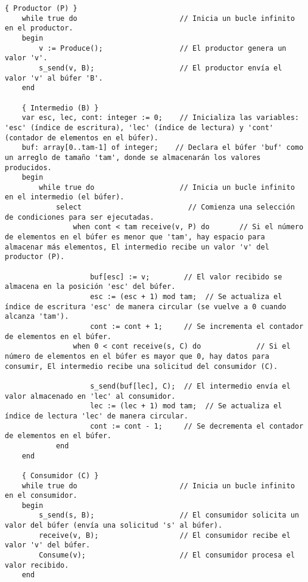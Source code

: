 \documentclass[a4paper,12pt]{article}
\begin{document}
\begin{lstlisting}[style=customcpp, caption={Productor-Consumidor con Búfer FIFO}, label={lst:prod-cons}]
    { Productor (P) }
    while true do                        // Inicia un bucle infinito en el productor.
    begin
        v := Produce();                  // El productor genera un valor 'v'.
        s_send(v, B);                    // El productor envía el valor 'v' al búfer 'B'.
    end
    
    { Intermedio (B) }
    var esc, lec, cont: integer := 0;    // Inicializa las variables: 'esc' (índice de escritura), 'lec' (índice de lectura) y 'cont' (contador de elementos en el búfer).
    buf: array[0..tam-1] of integer;    // Declara el búfer 'buf' como un arreglo de tamaño 'tam', donde se almacenarán los valores producidos.
    begin
        while true do                    // Inicia un bucle infinito en el intermedio (el búfer).
            select                         // Comienza una selección de condiciones para ser ejecutadas.
                when cont < tam receive(v, P) do       // Si el número de elementos en el búfer es menor que 'tam', hay espacio para almacenar más elementos, El intermedio recibe un valor 'v' del productor (P).

                    buf[esc] := v;        // El valor recibido se almacena en la posición 'esc' del búfer.
                    esc := (esc + 1) mod tam;  // Se actualiza el índice de escritura 'esc' de manera circular (se vuelve a 0 cuando alcanza 'tam').
                    cont := cont + 1;     // Se incrementa el contador de elementos en el búfer.
                when 0 < cont receive(s, C) do             // Si el número de elementos en el búfer es mayor que 0, hay datos para consumir, El intermedio recibe una solicitud del consumidor (C).

                    s_send(buf[lec], C);  // El intermedio envía el valor almacenado en 'lec' al consumidor.
                    lec := (lec + 1) mod tam;  // Se actualiza el índice de lectura 'lec' de manera circular.
                    cont := cont - 1;     // Se decrementa el contador de elementos en el búfer.
            end
    end
    
    { Consumidor (C) }
    while true do                        // Inicia un bucle infinito en el consumidor.
    begin
        s_send(s, B);                    // El consumidor solicita un valor del búfer (envía una solicitud 's' al búfer).
        receive(v, B);                   // El consumidor recibe el valor 'v' del búfer.
        Consume(v);                      // El consumidor procesa el valor recibido.
    end
\end{lstlisting}
\end{document}
